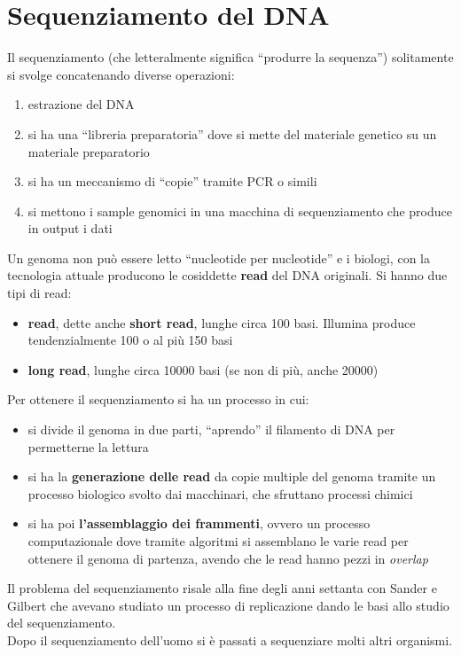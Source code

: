 \documentclass[a4paper,12pt, oneside]{book}
\begin{document}
\section{Sequenziamento del DNA}
Il sequenziamento (che letteralmente significa ``produrre la sequenza'')
solitamente si svolge concatenando diverse operazioni: 
\begin{enumerate}
  \item estrazione del DNA
  \item si ha una ``libreria preparatoria'' dove si mette del materiale genetico
  su un materiale preparatorio
  \item si ha un meccanismo di ``copie'' tramite PCR o simili
  \item si mettono i sample genomici in una macchina di sequenziamento che
  produce in output i dati
\end{enumerate}
Un genoma non può essere letto ``nucleotide per nucleotide'' e i biologi, con la
tecnologia attuale producono le cosiddette \textbf{read} del DNA originali. Si
hanno due tipi di read:
\begin{itemize}
  \item \textbf{read}, dette anche \textbf{short read}, lunghe circa 100
  basi. Illumina produce tendenzialmente 100 o al più 150 basi
  \item \textbf{long read}, lunghe circa 10000 basi (se non di più, anche 20000)
\end{itemize}
Per ottenere il sequenziamento si ha un processo in cui:
\begin{itemize}
  \item si divide il genoma in due parti, ``aprendo'' il filamento di DNA per
  permetterne la lettura
  \item si ha la \textbf{generazione delle read} da copie multiple del genoma
  tramite un processo biologico svolto dai macchinari, che sfruttano processi
  chimici 
  \item si ha poi \textbf{l'assemblaggio dei frammenti}, ovvero un processo
  computazionale dove tramite algoritmi si assemblano le varie read per ottenere
  il genoma di partenza, avendo che le read hanno pezzi in \textit{overlap}
\end{itemize}
Il problema del sequenziamento risale alla fine degli anni settanta con Sander e
Gilbert che avevano studiato un processo di replicazione dando le basi allo
studio del sequenziamento.\\
Dopo il sequenziamento dell'uomo si è passati a sequenziare molti altri
organismi.\\
\end{document}
